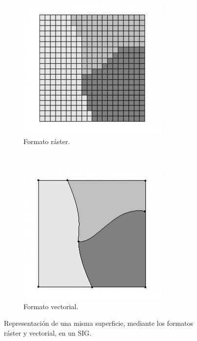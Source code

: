 \begin{figure}[!htbp]
    \centering
    \begin{subfigure}[b]{0.4\textwidth}
            \includegraphics[width=\textwidth]{capitulo-2/graphics/formato-raster.png}
            \caption{Formato ráster.}
    \end{subfigure}
    ~~~~
    \begin{subfigure}[b]{0.4\textwidth}
            \includegraphics[width=\textwidth]{capitulo-2/graphics/formato-vectorial.png}
            \caption{Formato vectorial.}

    \end{subfigure}
    \caption{\label{fig:sig-raster-vs-vectorial} Representación de una misma superficie, mediante los formatos ráster y vectorial, en un SIG.}
\end{figure}

